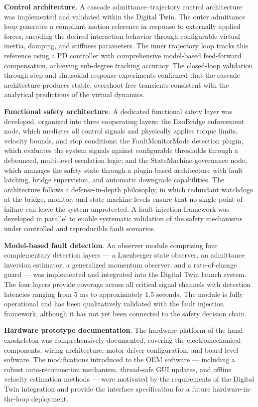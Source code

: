 \textbf{Control architecture}. A cascade admittance–trajectory control architecture was implemented and validated within the Digital Twin. The outer admittance loop generates a compliant motion reference in response to externally applied forces, encoding the desired interaction behavior through configurable virtual inertia, damping, and stiffness parameters. The inner trajectory loop tracks this reference using a PD controller with comprehensive model-based feed-forward compensation, achieving sub-degree tracking accuracy. The closed-loop validation through step and sinusoidal response experiments confirmed that the cascade architecture produces stable, overshoot-free transients consistent with the analytical predictions of the virtual dynamics.

\textbf{Functional safety architecture}. A dedicated functional safety layer was developed, organized into three cooperating layers: the ExoBridge enforcement node, which mediates all control signals and physically applies torque limits, velocity bounds, and stop conditions; the FaultMonitorMode detection plugin, which evaluates the system signals against configurable thresholds through a debounced, multi-level escalation logic; and the StateMachine governance node, which manages the safety state through a plugin-based architecture with fault latching, bridge supervision, and automatic downgrade capabilities. The architecture follows a defense-in-depth philosophy, in which redundant watchdogs at the bridge, monitor, and state machine levels ensure that no single point of failure can leave the system unprotected. A fault injection framework was developed in parallel to enable systematic validation of the safety mechanisms under controlled and reproducible fault scenarios.

\textbf{Model-based fault detection}. An observer module comprising four complementary detection layers — a Luenberger state observer, an admittance inversion estimator, a generalized momentum observer, and a rate-of-change guard — was implemented and integrated into the Digital Twin launch system. The four layers provide coverage across all critical signal channels with detection latencies ranging from 5 ms to approximately 1.5 seconds. The module is fully operational and has been qualitatively validated with the fault injection framework, although it has not yet been connected to the safety decision chain.

\textbf{Hardware prototype documentation}. The hardware platform of the hand exoskeleton was comprehensively documented, covering the electromechanical components, wiring architecture, motor driver configuration, and board-level software. The modifications introduced to the OEM software — including a robust auto-reconnection mechanism, thread-safe GUI updates, and offline velocity estimation methods — were motivated by the requirements of the Digital Twin integration and provide the interface specification for a future hardware-in-the-loop deployment.

